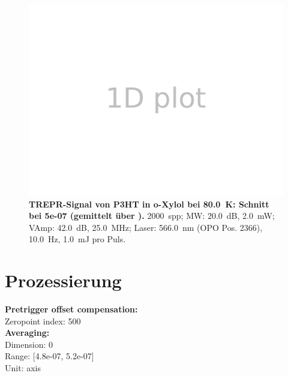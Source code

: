 \documentclass{article}
\begin{document}
\begin{figure}[H]
	\includegraphics[width=\textwidth]{Plotter1D}
\caption{\textbf{TREPR-Signal von P3HT in o-Xylol bei 80.0~K: Schnitt bei 5e-07 (gemittelt über ).} 2000~spp; MW: 20.0~dB, 2.0~mW; VAmp: 42.0~dB, 25.0~MHz; Laser: 566.0~nm (OPO Pos. 2366), 10.0~Hz, 1.0~mJ pro Puls.}  
\end{figure}

\section*{Prozessierung}

	\textbf{Pretrigger offset compensation:}
	\\
			Zeropoint index: 500
		\\
		\textbf{Averaging:}
	\\
			Dimension: 0
		\\
			Range: [4.8e-07, 5.2e-07]
		\\
			Unit: axis
		\\
	
\end{document}
